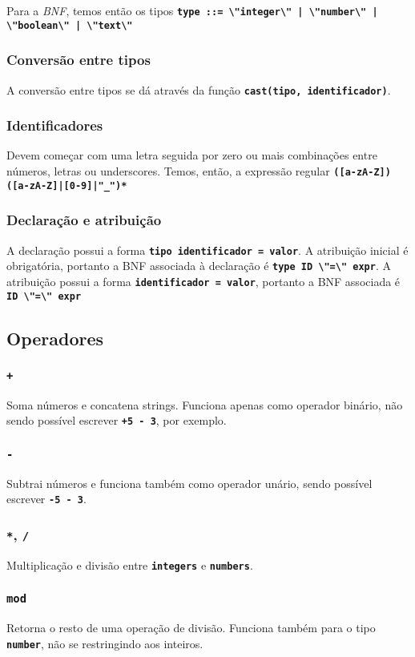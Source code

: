 \documentclass[12pt, a4paper]{article}
\newcommand{\ic}[1]{\textbf{\lstinline{#1}}}
\begin{document}
Para a \emph{BNF}, temos então os tipos \ic{type ::= \"integer\" | \"number\" | \"boolean\" | \"text\"}

\subsubsection{Conversão entre tipos}
A conversão entre tipos se dá através da função \ic{cast(tipo, identificador)}.

\subsubsection{Identificadores}
Devem começar com uma letra seguida por zero ou mais combinações entre números, letras
ou underscores. Temos, então, a expressão regular
\ic{([a-zA-Z])([a-zA-Z]|[0-9]|"_")*}

\subsubsection{Declaração e atribuição}
A declaração possui a forma \ic{tipo identificador = valor}. A atribuição
inicial é obrigatória, portanto a BNF associada à declaração é \ic{type ID
\"=\" expr}. A atribuição possui a forma \ic{identificador = valor},
portanto a BNF associada é \ic{ID \"=\" expr}

\subsection{Operadores}
\subsubsection{\ic{+}}
Soma números e concatena strings. Funciona apenas como operador binário, não
sendo possível escrever \ic{+5 - 3}, por exemplo.

\subsubsection{\ic{-}}
Subtrai números e funciona também como operador unário, sendo possível escrever
\ic{-5 - 3}.

\subsubsection{\ic{*}, \ic{/}}
Multiplicação e divisão entre \ic{integers} e \ic{numbers}.

\subsubsection{\ic{mod}}
Retorna o resto de uma operação de divisão. Funciona também para o tipo
\ic{number}, não se restringindo aos inteiros.
\end{document}
